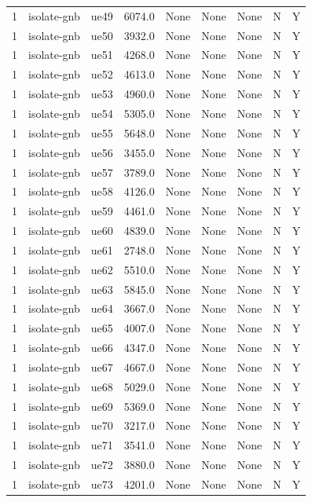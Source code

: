 \begin{table}[ht]
\begin{tabular}{|c|c|c|c|c|c|c|c|c|}
1 & isolate-gnb & ue49 & 6074.0 & None & None & None & N & Y \\
1 & isolate-gnb & ue50 & 3932.0 & None & None & None & N & Y \\
1 & isolate-gnb & ue51 & 4268.0 & None & None & None & N & Y \\
1 & isolate-gnb & ue52 & 4613.0 & None & None & None & N & Y \\
1 & isolate-gnb & ue53 & 4960.0 & None & None & None & N & Y \\
1 & isolate-gnb & ue54 & 5305.0 & None & None & None & N & Y \\
1 & isolate-gnb & ue55 & 5648.0 & None & None & None & N & Y \\
1 & isolate-gnb & ue56 & 3455.0 & None & None & None & N & Y \\
1 & isolate-gnb & ue57 & 3789.0 & None & None & None & N & Y \\
1 & isolate-gnb & ue58 & 4126.0 & None & None & None & N & Y \\
1 & isolate-gnb & ue59 & 4461.0 & None & None & None & N & Y \\
1 & isolate-gnb & ue60 & 4839.0 & None & None & None & N & Y \\
1 & isolate-gnb & ue61 & 2748.0 & None & None & None & N & Y \\
1 & isolate-gnb & ue62 & 5510.0 & None & None & None & N & Y \\
1 & isolate-gnb & ue63 & 5845.0 & None & None & None & N & Y \\
1 & isolate-gnb & ue64 & 3667.0 & None & None & None & N & Y \\
1 & isolate-gnb & ue65 & 4007.0 & None & None & None & N & Y \\
1 & isolate-gnb & ue66 & 4347.0 & None & None & None & N & Y \\
1 & isolate-gnb & ue67 & 4667.0 & None & None & None & N & Y \\
1 & isolate-gnb & ue68 & 5029.0 & None & None & None & N & Y \\
1 & isolate-gnb & ue69 & 5369.0 & None & None & None & N & Y \\
1 & isolate-gnb & ue70 & 3217.0 & None & None & None & N & Y \\
1 & isolate-gnb & ue71 & 3541.0 & None & None & None & N & Y \\
1 & isolate-gnb & ue72 & 3880.0 & None & None & None & N & Y \\
1 & isolate-gnb & ue73 & 4201.0 & None & None & None & N & Y \\

\end{tabular}
\end{table}
